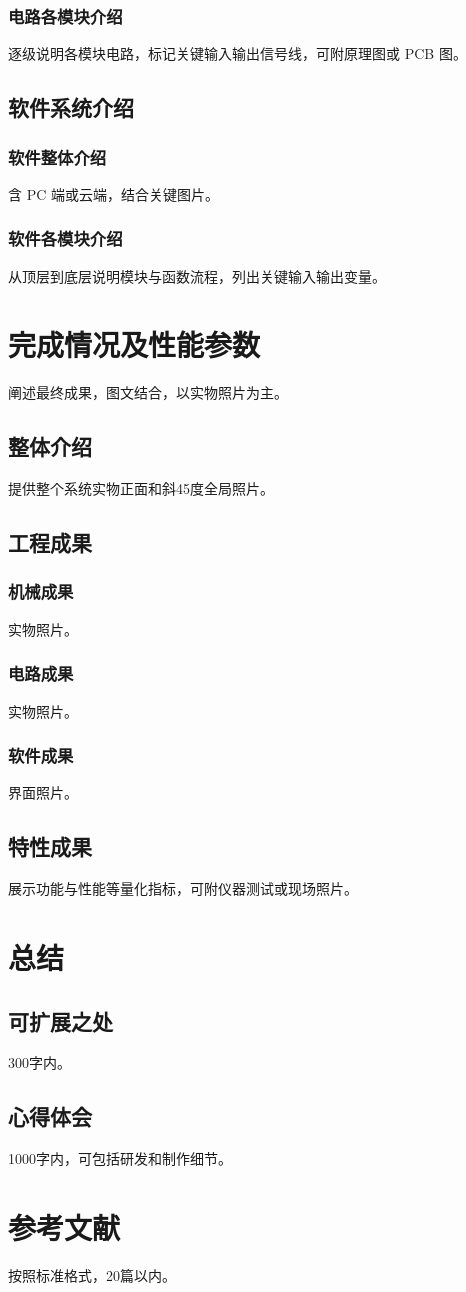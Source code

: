 \documentclass[UTF8,fontset=fandol,zihao=-4]{ctexart}
\newcommand{\slot}[1]{\par{\color{black!55}#1}\par\vspace{6pt}}
\begin{document}
\subsubsection{电路各模块介绍}\slot{逐级说明各模块电路，标记关键输入输出信号线，可附原理图或 PCB 图。}
\subsection{软件系统介绍}
\subsubsection{软件整体介绍}\slot{含 PC 端或云端，结合关键图片。}
\subsubsection{软件各模块介绍}\slot{从顶层到底层说明模块与函数流程，列出关键输入输出变量。}
\section{完成情况及性能参数}
\slot{阐述最终成果，图文结合，以实物照片为主。}
\subsection{整体介绍}\slot{提供整个系统实物正面和斜45度全局照片。}
\subsection{工程成果}
\subsubsection{机械成果}\slot{实物照片。}
\subsubsection{电路成果}\slot{实物照片。}
\subsubsection{软件成果}\slot{界面照片。}
\subsection{特性成果}\slot{展示功能与性能等量化指标，可附仪器测试或现场照片。}
\section{总结}
\subsection{可扩展之处}\slot{300字内。}
\subsection{心得体会}\slot{1000字内，可包括研发和制作细节。}
\section{参考文献}\slot{按照标准格式，20篇以内。}
\end{document}
